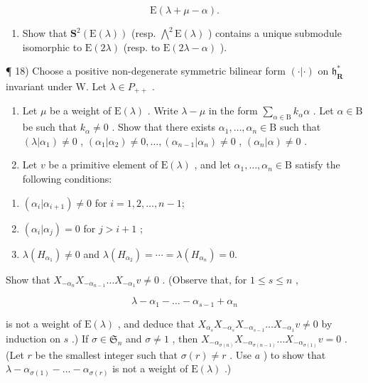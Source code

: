 \[
\mathrm{E} (\lambda + \mu - \alpha).
\]

\begin{enumerate}
\def\labelenumi{\alph{enumi})}
\setcounter{enumi}{3}
\tightlist
\item
  Show that \(\mathbf{S}^{2}(\mathrm{E}(\lambda))\) (resp. \(\bigwedge^{2}\mathrm{E}(\lambda)\) ) contains a unique submodule isomorphic to \(\mathrm{E}(2\lambda)\) (resp. to \(\mathrm{E}(2\lambda-\alpha)\) ).
\end{enumerate}

¶ 18) Choose a positive non-degenerate symmetric bilinear form \((\cdot|\cdot)\) on \(\mathfrak{h}_{\mathbf{R}}^{*}\) invariant under W. Let \(\lambda \in P_{++}\) .

\begin{enumerate}
\def\labelenumi{\alph{enumi})}
\item
  Let \(\mu\) be a weight of \(\mathrm{E}(\lambda)\) . Write \(\lambda - \mu\) in the form \(\sum_{\alpha \in \mathrm{B}} k_{\alpha} \alpha\) . Let \(\alpha \in \mathrm{B}\) be such that \(k_{\alpha} \neq 0\) . Show that there exists \(\alpha_{1}, \ldots, \alpha_{n} \in \mathrm{B}\) such that \((\lambda | \alpha_{1}) \neq 0\) , \((\alpha_{1} | \alpha_{2}) \neq 0, \ldots, (\alpha_{n-1} | \alpha_{n}) \neq 0\) , \((\alpha_{n} | \alpha) \neq 0\) .
\item
  Let \(v\) be a primitive element of \(\mathrm{E}(\lambda)\) , and let \(\alpha_1, \ldots, \alpha_n \in \mathrm{B}\) satisfy the following conditions:
\end{enumerate}

\begin{enumerate}
\def\labelenumi{(\roman{enumi})}
\item
  \((\alpha_{i}|\alpha_{i+1})\neq0\) for \(i=1,2,\ldots,n-1;\)
\item
  \((\alpha_{i}|\alpha_{j}) = 0\) for \(j > i + 1\) ;
\item
  \(\lambda(H_{\alpha_{1}})\neq0\) and \(\lambda(H_{\alpha_{2}})=\cdots=\lambda(H_{\alpha_{n}})=0.\)
\end{enumerate}

Show that \(X_{-\alpha_n}X_{-\alpha_{n-1}} \ldots X_{-\alpha_1}v \neq 0\) . (Observe that, for \(1 \leq s \leq n\) ,

\[
\lambda - \alpha_ {1} - \dots - \alpha_ {s - 1} + \alpha_ {n}
\]

is not a weight of \(\mathrm{E}(\lambda)\) , and deduce that \(X_{\alpha_s}X_{-\alpha_s}X_{-\alpha_{s-1}}\ldots X_{-\alpha_1}v\neq 0\) by induction on \(s\) .) If \(\sigma \in \mathfrak{S}_n\) and \(\sigma \neq 1\) , then \(X_{-\alpha_{\sigma(n)}}X_{-\alpha_{\sigma(n-1)}}\ldots X_{-\alpha_{\sigma(1)}}v = 0\) . (Let \(r\) be the smallest integer such that \(\sigma(r)\neq r\) . Use \(a\) ) to show that \(\lambda -\alpha_{\sigma(1)} - \ldots -\alpha_{\sigma(r)}\) is not a weight of \(\mathrm{E}(\lambda)\) .)

